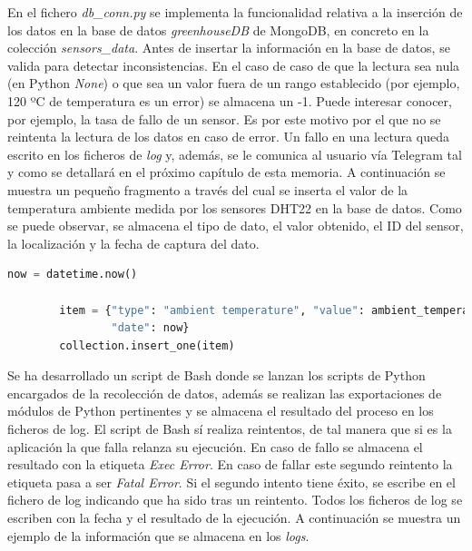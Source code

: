 \documentclass[a4paper, 12pt, oneside]{book}
\begin{document}
En el fichero \textit{db\_conn.py} se implementa la funcionalidad relativa a la inserción de los datos en la base de datos \textit{greenhouseDB} de MongoDB, en concreto en la colección \textit{sensors\_data}. Antes de insertar la información en la base de datos, se valida para detectar inconsistencias. En el caso de caso de que la lectura sea nula (en Python \textit{None}) o que sea un valor fuera de un rango establecido (por ejemplo, 120 ºC de temperatura es un error) se almacena un -1. Puede interesar conocer, por ejemplo, la tasa de fallo de un sensor. Es por este motivo por el que no se reintenta la lectura de los datos en caso de error. Un fallo en una lectura queda escrito en los ficheros de \textit{log} y, además, se le comunica al usuario vía Telegram tal y como se detallará en el próximo capítulo de esta memoria.
A continuación se muestra un pequeño fragmento a través del cual se inserta el valor de la temperatura ambiente medida por los sensores DHT22 en la base de datos. Como se puede observar, se almacena el tipo de dato, el valor obtenido, el ID del sensor, la localización y la fecha de captura del dato.


\begin{lstlisting}[language=Python]
        now = datetime.now()

        item = {"type": "ambient temperature", "value": ambient_temperature, "sensorID": d.pin, "location": d.location,
                "date": now}
        collection.insert_one(item)
\end{lstlisting}

Se ha desarrollado un script de Bash donde se lanzan los scripts de Python encargados de la recolección de datos, además se realizan las exportaciones de módulos de Python pertinentes y se almacena el resultado del proceso en los ficheros de log. El script de Bash sí realiza reintentos, de tal manera que si es la aplicación la que falla relanza su ejecución. En caso de fallo se almacena el resultado con la etiqueta \textit{Exec Error}. En caso de fallar este segundo reintento la etiqueta pasa a ser \textit{Fatal Error}. Si el segundo intento tiene éxito, se escribe en el fichero de log indicando que ha sido tras un reintento. Todos los ficheros de log se escriben con la fecha y el resultado de la ejecución.
A continuación se muestra un ejemplo de la información que se almacena en los \textit{logs}.
\end{document}
